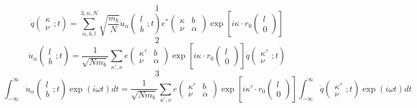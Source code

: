 \documentclass{article}
\begin{document}
\[1\]
\[\dot{q}\left(\begin{array}{c} {\kappa } \\ {\nu } \end{array};t\right)=\sum _{\alpha ,b,l}^{3,n,N}\sqrt{\frac{m_{b} }{N} }  \dot{u}_{\alpha } \left(\begin{array}{c} {l} \\ {b} \end{array};t\right)e^{*} \left(\begin{array}{cc} {\kappa } & {b} \\ {\nu } & {\alpha } \end{array}\right)\exp \left[i\kappa \cdot r_{0} (\begin{array}{c} {l} \\ {0} \end{array})\right]\]
\[2\]
\[\dot{u}_{\alpha } \left(\begin{array}{c} {l} \\ {b} \end{array};t\right)=\frac{1}{\sqrt{Nm_{b} } } \sum _{\kappa ',\nu }e\left(\begin{array}{cc} {\kappa '} & {b} \\ {\nu } & {\alpha } \end{array}\right) \exp \left[i\kappa \cdot r_{0} \left(\begin{array}{c} {l} \\ {0} \end{array}\right)\right]\dot{q}\left(\begin{array}{c} {\kappa '} \\ {\nu } \end{array};t\right)\]
\[3\]
\[\int _{-\infty }^{\infty }\dot{u}_{\alpha } \left(\begin{array}{c} {l} \\ {b} \end{array};t\right)\exp (i\omega t)dt =\frac{1}{\sqrt{Nm_{b} } } \sum _{\kappa ',\nu }e\left(\begin{array}{cc} {\kappa '} & {b} \\ {\nu } & {\alpha } \end{array}\right) \exp \left[i\kappa '\cdot r_{0} (\begin{array}{c} {l} \\ {0} \end{array})\right]\int _{-\infty }^{\infty }\dot{q}\left(\begin{array}{c} {\kappa '} \\ {\nu } \end{array};t\right)\exp (i\omega t)dt \]
\end{document}
